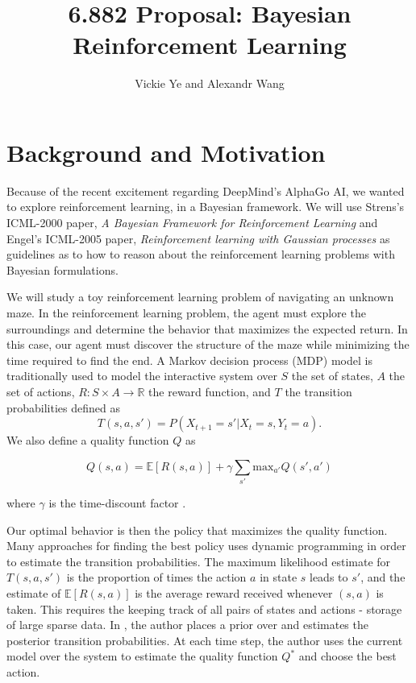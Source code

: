 \documentclass[11pt, twoside]{article}
\title{6.882 Proposal: Bayesian Reinforcement Learning}
\date{}
\author {Vickie Ye and Alexandr Wang}
\begin{document}
\maketitle

\section{Background and Motivation}
Because of the recent excitement regarding DeepMind's AlphaGo AI, we wanted to
explore reinforcement learning, in a Bayesian framework. We will use Strens's
ICML-2000 paper, \textit{A Bayesian Framework for Reinforcement Learning} and Engel's ICML-2005 paper, \textit{Reinforcement learning with Gaussian processes} as
guidelines as to how to reason about the reinforcement learning problems with Bayesian formulations.

We will study a toy reinforcement learning problem of navigating an unknown maze.
In the reinforcement learning problem, the agent must explore the surroundings
and determine the behavior that maximizes the expected return. In this case, our
agent must discover the structure of the maze while minimizing the time required
to find the end. A Markov decision process (MDP) model is traditionally used to
model the interactive system over $S$ the set of states, $A$ the set of actions,
$R: S \times A \rightarrow \mathbb{R}$ the reward function, and $T$ the transition
probabilities defined as
\begin{equation}
T(s, a, s') = P(X_{t+1} = s' | X_t = s, Y_t = a).
\end{equation}
We also define a quality function $Q$ as

\begin{equation}
Q(s, a) = \mathbb{E}[R(s, a)] + \gamma \sum_{s'} \textrm{max}_{a'} Q(s', a')
\end{equation}

where $\gamma$ is the time-discount factor \citep[p.3]{strens}.

Our optimal behavior is then the policy that maximizes the quality function. Many
approaches for finding the best policy uses dynamic programming in order to estimate
the transition probabilities. The maximum likelihood estimate for $T(s, a, s')$ is
the proportion of times the action $a$ in state $s$ leads to $s'$, and the estimate of
$\mathbb{E}[R(s, a)]$ is the average reward received whenever $(s, a)$ is taken. This
requires the keeping track of all pairs of states and actions - storage of large
sparse data. In \cite{strens}, the author places a prior over and estimates the
posterior transition probabilities. At each time step, the author uses the current
model over the system to estimate the quality function $Q^*$ and choose the best
action. 
\end{document}
